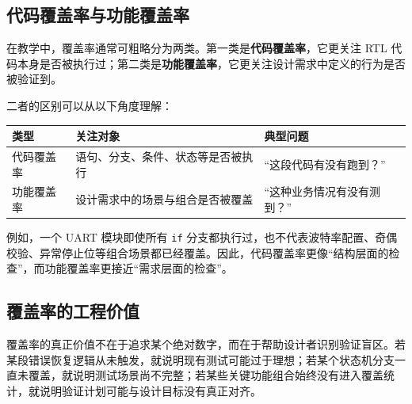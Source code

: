 \subsection{代码覆盖率与功能覆盖率}\label{ux4ee3ux7801ux8986ux76d6ux7387ux4e0eux529fux80fdux8986ux76d6ux7387}

在教学中，覆盖率通常可粗略分为两类。第一类是\textbf{代码覆盖率}，它更关注
RTL
代码本身是否被执行过；第二类是\textbf{功能覆盖率}，它更关注设计需求中定义的行为是否被验证到。

二者的区别可以从以下角度理解：

\begin{longtable}[]{@{}
  >{\raggedright\arraybackslash}p{}
  >{\raggedright\arraybackslash}p{}
  >{\raggedright\arraybackslash}p{}@{}}
\toprule\noalign{}
\begin{minipage}[b]{\linewidth}\raggedright
类型
\end{minipage} & \begin{minipage}[b]{\linewidth}\raggedright
关注对象
\end{minipage} & \begin{minipage}[b]{\linewidth}\raggedright
典型问题
\end{minipage} \\
\midrule\noalign{}
\endhead
\bottomrule\noalign{}
\endlastfoot
代码覆盖率 & 语句、分支、条件、状态等是否被执行 &
``这段代码有没有跑到？'' \\
功能覆盖率 & 设计需求中的场景与组合是否被覆盖 &
``这种业务情况有没有测到？'' \\
\end{longtable}

例如，一个 UART 模块即使所有 \passthrough{\lstinline!if!}
分支都执行过，也不代表波特率配置、奇偶校验、异常停止位等组合场景都已经覆盖。因此，代码覆盖率更像``结构层面的检查''，而功能覆盖率更接近``需求层面的检查''。

\subsection{覆盖率的工程价值}\label{ux8986ux76d6ux7387ux7684ux5de5ux7a0bux4ef7ux503c}

覆盖率的真正价值不在于追求某个绝对数字，而在于帮助设计者识别验证盲区。若某段错误恢复逻辑从未触发，就说明现有测试可能过于理想；若某个状态机分支一直未覆盖，就说明测试场景尚不完整；若某些关键功能组合始终没有进入覆盖统计，就说明验证计划可能与设计目标没有真正对齐。

